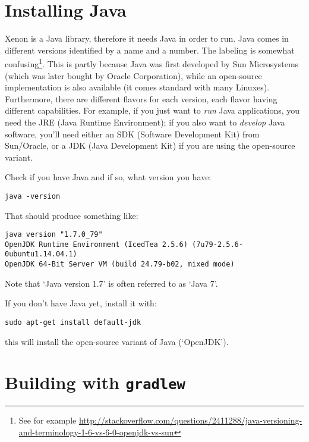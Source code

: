 \section{Installing Java}

Xenon is a Java library, therefore it needs Java in order to run. Java comes in different versions identified by a name and a number. The labeling is somewhat confusing\footnote{See for example \url{http://stackoverflow.com/questions/2411288/java-versioning-and-terminology-1-6-vs-6-0-openjdk-vs-sun}}. This is partly because Java was first developed by Sun Microsystems (which was later bought by Oracle Corporation), while an open-source implementation is also available (it comes standard with many Linuxes). Furthermore, there are different flavors for each version, each flavor having different capabilities. For example, if you just want to \textit{run} Java applications, you need the JRE (Java Runtime Environment); if you also want to \textit{develop} Java software, you'll need either an SDK (Software Development Kit) from Sun/Oracle, or a JDK (Java Development Kit) if you are using the open-source variant.

Check if you have Java and if so, what version you have:
\begin{lstlisting}[style=basic,style=bash]
java -version
\end{lstlisting}
That should produce something like:
\begin{lstlisting}[style=basic,style=bash]
java version "1.7.0_79"
OpenJDK Runtime Environment (IcedTea 2.5.6) (7u79-2.5.6-0ubuntu1.14.04.1)
OpenJDK 64-Bit Server VM (build 24.79-b02, mixed mode)
\end{lstlisting}
Note that `Java version 1.7' is often referred to as `Java 7'.

If you don't have Java yet, install it with:
\begin{lstlisting}[style=basic,style=bash]
sudo apt-get install default-jdk
\end{lstlisting}
this will install the open-source variant of Java (`OpenJDK').












\section{Building with \texttt{gradlew}}

